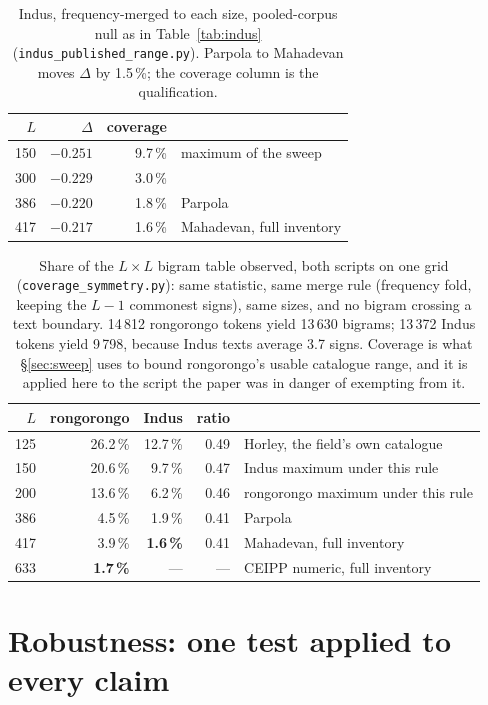 \documentclass[11pt,a4paper]{article}
\begin{document}
\begin{table}[t]
\centering\small
\begin{tabular}{r r r l}
\toprule
$L$ & $\Delta$ & coverage & \\
\midrule
150 & $-0.251$ & 9.7\,\% & maximum of the sweep \\
300 & $-0.229$ & 3.0\,\% & \\
386 & $-0.220$ & 1.8\,\% & Parpola \\
417 & $-0.217$ & 1.6\,\% & Mahadevan, full inventory \\
\bottomrule
\end{tabular}
\caption{Indus, frequency-merged to each size, pooled-corpus null as in Table~\ref{tab:indus} (\texttt{indus\_published\_range.py}). Parpola to Mahadevan moves $\Delta$ by 1.5\,\%; the coverage column is the qualification.}
\label{tab:indusrange}
\end{table}

\begin{table}[t]
\centering\small
\begin{tabular}{r r r r l}
\toprule
$L$ & rongorongo & Indus & ratio & \\
\midrule
125 & 26.2\,\% & 12.7\,\% & 0.49 & Horley, the field's own catalogue \\
150 & 20.6\,\% & 9.7\,\% & 0.47 & Indus maximum under this rule \\
200 & 13.6\,\% & 6.2\,\% & 0.46 & rongorongo maximum under this rule \\
386 & 4.5\,\% & 1.9\,\% & 0.41 & Parpola \\
417 & 3.9\,\% & \textbf{1.6\,\%} & 0.41 & Mahadevan, full inventory \\
633 & \textbf{1.7\,\%} & --- & --- & CEIPP numeric, full inventory \\
\bottomrule
\end{tabular}
\caption{Share of the $L\times L$ bigram table observed, both scripts on one grid
(\texttt{coverage\_symmetry.py}): same statistic, same merge rule (frequency fold,
keeping the $L-1$ commonest signs), same sizes, and no bigram crossing a text
boundary. 14\,812 rongorongo tokens yield 13\,630 bigrams; 13\,372 Indus tokens yield
9\,798, because Indus texts average 3.7 signs. Coverage is what \S\ref{sec:sweep} uses
to bound rongorongo's usable catalogue range, and it is applied here to the script the
paper was in danger of exempting from it.}
\label{tab:coverage}
\end{table}


\section{Robustness: one test applied to every claim}
\label{sec:robust}
\end{document}
